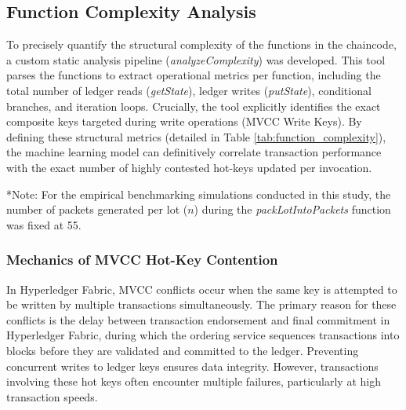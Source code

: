 ﻿\documentclass[12pt]{article}
\begin{document}
\subsection{Function Complexity Analysis}

To precisely quantify the structural complexity of the functions in the chaincode, a custom static analysis pipeline (\textit{analyzeComplexity}) was developed. This tool parses the functions to extract operational metrics per function, including the total number of ledger reads (\textit{getState}), ledger writes (\textit{putState}), conditional branches, and iteration loops. Crucially, the tool explicitly identifies the exact composite keys targeted during write operations (MVCC Write Keys). By defining these structural metrics (detailed in Table \ref{tab:function_complexity}), the machine learning model can definitively correlate transaction performance with the exact number of highly contested hot-keys updated per invocation.
\begin{table}[ht]
\centering
\caption{Static Analysis of Smart Contract Function Complexity and MVCC Hot-Keys}
\label{tab:function_complexity}
\end{table}

\vspace{0.2cm}
\noindent \small{*Note: For the empirical benchmarking simulations conducted in this study, the number of packets generated per lot ($n$) during the \textit{packLotIntoPackets} function was fixed at 55.}

 
  \subsubsection{Mechanics of MVCC Hot-Key Contention}
  In Hyperledger Fabric, MVCC conflicts occur when the same key is attempted to be written by multiple transactions simultaneously. The primary reason for these conflicts is the delay between transaction endorsement and final commitment in Hyperledger Fabric, during which the ordering service sequences transactions into blocks before they are validated and committed to the ledger. Preventing concurrent writes to ledger keys ensures data integrity. However, transactions involving these hot keys often encounter multiple failures, particularly at high transaction speeds.
\end{document}
